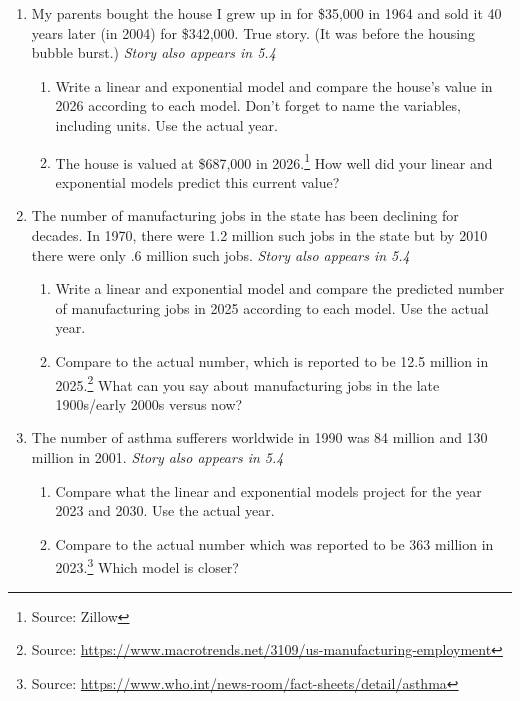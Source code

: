 \begin{enumerate} 


\item %

My parents bought the house I grew up in for \$35,000 in 1964 and sold it 40 years later (in 2004) for \$342,000. True story.  (It was before the housing bubble burst.) \hfill \emph{Story also appears in 5.4}
\begin{enumerate}
    \item Write a linear and exponential model and compare the house's value in 2026 according to each model. Don't forget to name the variables, including units. Use the actual year.
    \item The house is valued at \$687,000 in 2026.\footnote{Source: Zillow}  How well did your linear and exponential models predict this current value?
\end{enumerate}

\item %
The number of manufacturing jobs in the state has been declining for decades. In 1970, there were 1.2 million such jobs in the state but by 2010 there were only .6 million such jobs. 
\hfill \emph{Story also appears in 5.4}
\begin{enumerate}
    \item Write a linear and exponential model and compare the predicted number of manufacturing jobs in 2025 according to each model. Use the actual year.  
    \item Compare to the actual number, which is reported to be 12.5 million in 2025.\footnote{Source: \url{https://www.macrotrends.net/3109/us-manufacturing-employment}} What can you say about manufacturing jobs in the late 1900s/early 2000s versus now?
\end{enumerate}

\item %
The number of asthma sufferers worldwide in 1990 was 84 million and 130 million
in 2001. 
\hfill \emph{Story also appears in 5.4}
\begin{enumerate}
    \item Compare what the linear and exponential models project for the year 2023 and 2030. Use the actual year.
    \item Compare to the actual number which was reported to be 363 million in 2023.\footnote{Source: \url{https://www.who.int/news-room/fact-sheets/detail/asthma}} Which model is closer?
\end{enumerate}
 

\end{enumerate}
